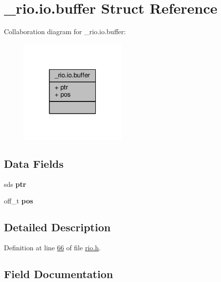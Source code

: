 \hypertarget{struct__rio_8io_8buffer}{}\section{\+\_\+rio.\+io.\+buffer Struct Reference}
\label{struct__rio_8io_8buffer}


Collaboration diagram for \+\_\+rio.\+io.\+buffer\+:\nopagebreak
\begin{figure}[H]
\begin{center}
\leavevmode
\includegraphics[width=151pt]{struct__rio_8io_8buffer__coll__graph}
\end{center}
\end{figure}
\subsection*{Data Fields}
\begin{DoxyCompactItemize}
\item 
\mbox{\label{struct__rio_8io_8buffer_a4d9ad2b37053671b594b237bd061b3f2}} 
sds {\bfseries ptr}
\item 
\mbox{\label{struct__rio_8io_8buffer_a5e0bdcbddccca4d66d74ba8c1cee1a68}} 
off\+\_\+t {\bfseries pos}
\end{DoxyCompactItemize}


\subsection{Detailed Description}


Definition at line \hyperlink{rio_8h_source_l00066}{66} of file \hyperlink{rio_8h_source}{rio.\+h}.



\subsection{Field Documentation}
\mbox{\label{struct__rio_8io_8buffer_a5e0bdcbddccca4d66d74ba8c1cee1a68}} 
